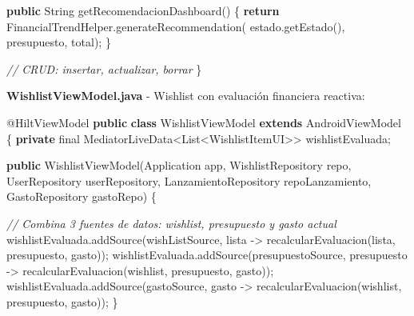 \documentclass[
  spanish,
  11pt,
  paper=a4,
  ,captions=tableheading
]{scrartcl}
\newenvironment{Shaded}{}{}
\newcommand{\AttributeTok}[1]{\textcolor[rgb]{0.49,0.56,0.16}{#1}}
\newcommand{\BuiltInTok}[1]{\textcolor[rgb]{0.00,0.50,0.00}{#1}}
\newcommand{\CommentTok}[1]{\textcolor[rgb]{0.38,0.63,0.69}{\textit{#1}}}
\newcommand{\ControlFlowTok}[1]{\textcolor[rgb]{0.00,0.44,0.13}{\textbf{#1}}}
\newcommand{\DataTypeTok}[1]{\textcolor[rgb]{0.56,0.13,0.00}{#1}}
\newcommand{\FunctionTok}[1]{\textcolor[rgb]{0.02,0.16,0.49}{#1}}
\newcommand{\KeywordTok}[1]{\textcolor[rgb]{0.00,0.44,0.13}{\textbf{#1}}}
\newcommand{\NormalTok}[1]{#1}
\newcommand{\OperatorTok}[1]{\textcolor[rgb]{0.40,0.40,0.40}{#1}}
\begin{document}
\begin{Shaded}
\begin{Highlighting}[]
    \KeywordTok{public} \BuiltInTok{String} \FunctionTok{getRecomendacionDashboard}\OperatorTok{()} \OperatorTok{\{}
        \ControlFlowTok{return}\NormalTok{ FinancialTrendHelper}\OperatorTok{.}\FunctionTok{generateRecommendation}\OperatorTok{(}
\NormalTok{            estado}\OperatorTok{.}\FunctionTok{getEstado}\OperatorTok{(),}\NormalTok{ presupuesto}\OperatorTok{,}\NormalTok{ total}\OperatorTok{);}
    \OperatorTok{\}}

    \CommentTok{// CRUD: insertar, actualizar, borrar}
\OperatorTok{\}}
\end{Highlighting}
\end{Shaded}

\textbf{WishlistViewModel.java} - Wishlist con evaluación financiera
reactiva:

\begin{Shaded}
\begin{Highlighting}[]
\AttributeTok{@HiltViewModel}
\KeywordTok{public} \KeywordTok{class}\NormalTok{ WishlistViewModel }\KeywordTok{extends}\NormalTok{ AndroidViewModel }\OperatorTok{\{}
    \KeywordTok{private} \DataTypeTok{final}\NormalTok{ MediatorLiveData}\OperatorTok{\textless{}}\BuiltInTok{List}\OperatorTok{\textless{}}\NormalTok{WishlistItemUI}\OperatorTok{\textgreater{}\textgreater{}}\NormalTok{ wishlistEvaluada}\OperatorTok{;}

    \KeywordTok{public} \FunctionTok{WishlistViewModel}\OperatorTok{(}\NormalTok{Application app}\OperatorTok{,}\NormalTok{ WishlistRepository repo}\OperatorTok{,}
\NormalTok{            UserRepository userRepository}\OperatorTok{,}\NormalTok{ LanzamientoRepository repoLanzamiento}\OperatorTok{,}
\NormalTok{            GastoRepository gastoRepo}\OperatorTok{)} \OperatorTok{\{}

        \CommentTok{// Combina 3 fuentes de datos: wishlist, presupuesto y gasto actual}
\NormalTok{        wishlistEvaluada}\OperatorTok{.}\FunctionTok{addSource}\OperatorTok{(}\NormalTok{wishListSource}\OperatorTok{,}\NormalTok{ lista }\OperatorTok{{-}\textgreater{}}
            \FunctionTok{recalcularEvaluacion}\OperatorTok{(}\NormalTok{lista}\OperatorTok{,}\NormalTok{ presupuesto}\OperatorTok{,}\NormalTok{ gasto}\OperatorTok{));}
\NormalTok{        wishlistEvaluada}\OperatorTok{.}\FunctionTok{addSource}\OperatorTok{(}\NormalTok{presupuestoSource}\OperatorTok{,}\NormalTok{ presupuesto }\OperatorTok{{-}\textgreater{}}
            \FunctionTok{recalcularEvaluacion}\OperatorTok{(}\NormalTok{wishlist}\OperatorTok{,}\NormalTok{ presupuesto}\OperatorTok{,}\NormalTok{ gasto}\OperatorTok{));}
\NormalTok{        wishlistEvaluada}\OperatorTok{.}\FunctionTok{addSource}\OperatorTok{(}\NormalTok{gastoSource}\OperatorTok{,}\NormalTok{ gasto }\OperatorTok{{-}\textgreater{}}
            \FunctionTok{recalcularEvaluacion}\OperatorTok{(}\NormalTok{wishlist}\OperatorTok{,}\NormalTok{ presupuesto}\OperatorTok{,}\NormalTok{ gasto}\OperatorTok{));}
    \OperatorTok{\}}


\end{Highlighting}
\end{Shaded}
\end{document}
